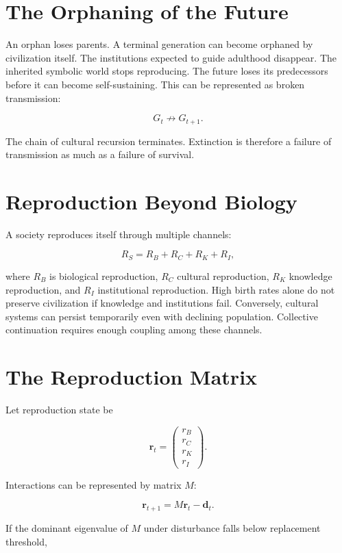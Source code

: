 \documentclass[11pt,oneside]{book}
\theoremstyle{definition}
\theoremstyle{remark}
\begin{document}
\section{The Orphaning of the Future}

An orphan loses parents. A terminal generation can become orphaned by civilization itself. The
institutions expected to guide adulthood disappear. The inherited symbolic world stops reproducing.
The future loses its predecessors before it can become self-sustaining. This can be represented as
broken transmission:

\[
G_t \not\rightarrow G_{t+1}.
\]

The chain of cultural recursion terminates. Extinction is therefore a failure of transmission as
much as a failure of survival.

\section{Reproduction Beyond Biology}

A society reproduces itself through multiple channels:

\[
R_S = R_B + R_C + R_K + R_I,
\]

where \(R_B\) is biological reproduction, \(R_C\) cultural reproduction, \(R_K\) knowledge
reproduction, and \(R_I\) institutional reproduction. High birth rates alone do not preserve
civilization if knowledge and institutions fail. Conversely, cultural systems can persist
temporarily even with declining population. Collective continuation requires enough coupling among
these channels.

\section{The Reproduction Matrix}

Let reproduction state be

\[
\mathbf r_t = \begin{pmatrix} r_B\\ r_C\\ r_K\\ r_I \end{pmatrix}.
\]

Interactions can be represented by matrix \(M\):

\[
\mathbf r_{t+1} = M\mathbf r_t-\mathbf d_t.
\]

If the dominant eigenvalue of \(M\) under disturbance falls below replacement threshold,
\end{document}
